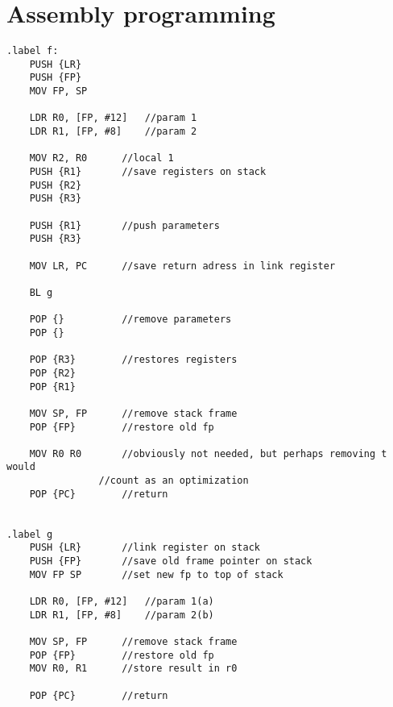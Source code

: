 \lstset{language=[x86masm]Assembler}
\section{Assembly programming}

\begin{lstlisting}
.label f:
	PUSH {LR}
	PUSH {FP}
	MOV FP, SP

	LDR R0, [FP, #12]	//param 1
	LDR R1, [FP, #8]	//param 2
	
	MOV R2, R0		//local 1
	PUSH {R1}		//save registers on stack
	PUSH {R2}
	PUSH {R3}

	PUSH {R1}		//push parameters
	PUSH {R3}
	
	MOV LR, PC		//save return adress in link register
	
	BL g 		
	
	POP {}			//remove parameters
	POP {}	
	
	POP {R3}		//restores registers		
	POP {R2}	
	POP {R1}
	
	MOV SP, FP		//remove stack frame
	POP {FP}		//restore old fp
	
	MOV R0 R0		//obviously not needed, but perhaps removing t would 
				//count as an optimization
	POP {PC}		//return
	

.label g
	PUSH {LR}		//link register on stack
	PUSH {FP}		//save old frame pointer on stack
	MOV FP SP		//set new fp to top of stack
	
	LDR R0, [FP, #12]	//param 1(a)
	LDR R1, [FP, #8]	//param 2(b)
	
	MOV SP, FP		//remove stack frame
	POP {FP}		//restore old fp
	MOV R0, R1		//store result in r0

	POP {PC}		//return
	
	

\end{lstlisting}
